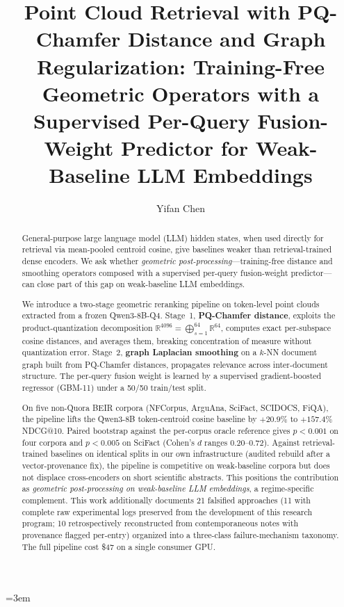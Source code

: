 \documentclass[review,1p]{elsarticle}
\begin{document}
\sloppy
\emergencystretch=3em


\begin{frontmatter}

\title{Point Cloud Retrieval with PQ-Chamfer Distance and Graph Regularization: Training-Free Geometric Operators with a Supervised Per-Query Fusion-Weight Predictor for Weak-Baseline LLM Embeddings}

\author{Yifan Chen}
\address{Independent Researcher, China}

\begin{abstract}
General-purpose large language model (LLM) hidden states, when used directly for retrieval via mean-pooled centroid cosine, give baselines weaker than retrieval-trained dense encoders. We ask whether \emph{geometric post-processing}---training-free distance and smoothing operators composed with a supervised per-query fusion-weight predictor---can close part of this gap on weak-baseline LLM embeddings.

We introduce a two-stage geometric reranking pipeline on token-level point clouds extracted from a frozen Qwen3-8B-Q4. Stage~1, \textbf{PQ-Chamfer distance}, exploits the product-quantization decomposition $\mathbb{R}^{4096} = \bigoplus_{s=1}^{64} \mathbb{R}^{64}$, computes exact per-subspace cosine distances, and averages them, breaking concentration of measure without quantization error. Stage~2, \textbf{graph Laplacian smoothing} on a $k$-NN document graph built from PQ-Chamfer distances, propagates relevance across inter-document structure. The per-query fusion weight is learned by a supervised gradient-boosted regressor (GBM-11) under a 50/50 train/test split.

On five non-Quora BEIR corpora (NFCorpus, ArguAna, SciFact, SCIDOCS, FiQA), the pipeline lifts the Qwen3-8B token-centroid cosine baseline by $+20.9\%$ to $+157.4\%$ NDCG@10. Paired bootstrap against the per-corpus oracle reference gives $p<0.001$ on four corpora and $p<0.005$ on SciFact (Cohen's $d$ ranges 0.20--0.72). Against retrieval-trained baselines on identical splits in our own infrastructure (audited rebuild after a vector-provenance fix), the pipeline is competitive on weak-baseline corpora but does not displace cross-encoders on short scientific abstracts. This positions the contribution as \emph{geometric post-processing on weak-baseline LLM embeddings}, a regime-specific complement. This work additionally documents 21 falsified approaches (11 with complete raw experimental logs preserved from the development of this research program; 10 retrospectively reconstructed from contemporaneous notes with provenance flagged per-entry) organized into a three-class failure-mechanism taxonomy. The full pipeline cost \$47 on a single consumer GPU.
\end{abstract}


\end{frontmatter}
\end{document}
